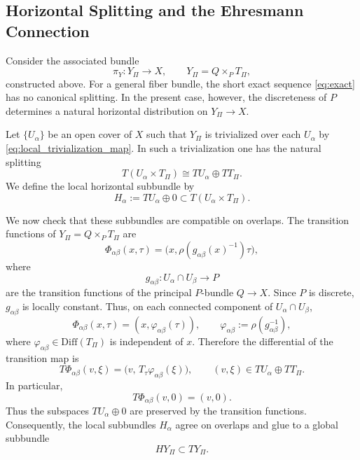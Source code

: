 \documentclass[11pt]{amsart}
\theoremstyle{plain}
\theoremstyle{definition}
\theoremstyle{remark}
\begin{document}
\subsection{Horizontal Splitting and the Ehresmann Connection}
\label{subsec:ehresmann}

Consider the associated bundle
\[
\pi_Y:Y_\Pi\to X,
\qquad
Y_\Pi=Q\times_P T_\Pi,
\]
constructed above. 
For a general fiber bundle, the short exact sequence \eqref{eq:exact} has no canonical splitting. 
In the present case, however, the discreteness of \(P\) determines a natural horizontal distribution on \(Y_\Pi\to X\).

Let \(\{U_\alpha\}\) be an open cover of \(X\) such that \(Y_\Pi\) is trivialized over each \(U_\alpha\) by \eqref{eq:local_trivialization_map}. 
In such a trivialization one has the natural splitting
\begin{equation}
	T(U_\alpha\times T_\Pi)\cong TU_\alpha \oplus TT_\Pi.
	\label{eq:local_splitting}
\end{equation}
We define the local horizontal subbundle by
\begin{equation}
	H_\alpha:= TU_\alpha \oplus 0 \subset T(U_\alpha\times T_\Pi).
	\label{eq:Halpha}
\end{equation}

We now check that these subbundles are compatible on overlaps. 
The transition functions of \(Y_\Pi=Q\times_P T_\Pi\) are
\begin{equation}
	\Phi_{\alpha\beta}(x,\tau)
	=
	\bigl(x,\rho(g_{\alpha\beta}(x)^{-1})\tau\bigr),
	\label{eq:Phi_transition}
\end{equation}
where
\[
g_{\alpha\beta}:U_\alpha\cap U_\beta\to P
\]
are the transition functions of the principal \(P\)-bundle \(Q\to X\). 
Since \(P\) is discrete, \(g_{\alpha\beta}\) is locally constant. 
Thus, on each connected component of \(U_\alpha\cap U_\beta\),
\begin{equation}
	\Phi_{\alpha\beta}(x,\tau)
	=
	(x,\varphi_{\alpha\beta}(\tau)),
	\qquad
	\varphi_{\alpha\beta}:=\rho(g_{\alpha\beta}^{-1}),
	\label{eq:varphi_alphabeta}
\end{equation}
where \(\varphi_{\alpha\beta}\in \mathrm{Diff}(T_\Pi)\) is independent of \(x\).
Therefore the differential of the transition map is
\begin{equation}
	T\Phi_{\alpha\beta}(v,\xi)
	=
	\bigl(v,\,T_\tau\varphi_{\alpha\beta}(\xi)\bigr),
	\qquad
	(v,\xi)\in TU_\alpha\oplus TT_\Pi.
	\label{eq:TPhi}
\end{equation}
In particular,
\begin{equation}
	T\Phi_{\alpha\beta}(v,0)=(v,0).
	\label{eq:horizontal_invariance}
\end{equation}
Thus the subspaces \(TU_\alpha\oplus 0\) are preserved by the transition functions. 
Consequently, the local subbundles \(H_\alpha\) agree on overlaps and glue to a global subbundle
\begin{equation}
	HY_\Pi \subset TY_\Pi.
	\label{eq:horizontal}
\end{equation}
\end{document}
